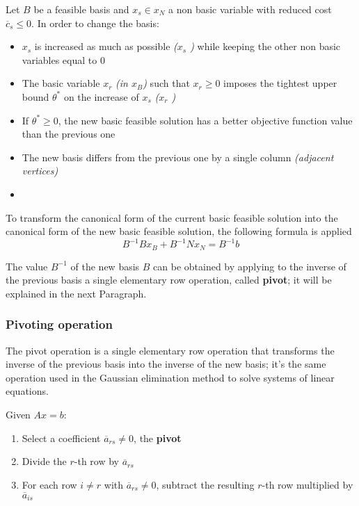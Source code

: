 \documentclass[english]{article}
\begin{document}
\bigskip
Let \(B\) be a feasible basis and \(x_s \in x_N\) a non basic variable with reduced cost \(\overline{c}_s \leq 0\).
In order to change the basis:

\begin{itemize}
  \item \(x_s\) is increased as much as possible \textit{(\(x_s\) )} while keeping the other non basic variables equal to \(0\)
  \item The basic variable \(x_r\) \textit{(in \(x_B\))} such that \(x_r \geq 0\) imposes the tightest upper bound \(\theta^\ast\) on the increase of \(x_s\) \textit{(\(x_r\) )}
  \item If \(\theta^\ast \geq 0\), the new basic feasible solution has a better objective function value than the previous one
  \item The new basis differs from the previous one by a single column \textit{(adjacent vertices)}
  \item
\end{itemize}

To transform the canonical form of the current basic feasible solution into the canonical form of the new basic feasible solution, the following formula is applied
\[B^{-1} B x_B + B^{-1} N x_N = B^{-1} b\]

The value \(B^{-1}\) of the new basis \(B\) can be obtained by applying to the inverse of the previous basis a single elementary row operation, called \textbf{pivot};
it will be explained in the next Paragraph.

\subsubsection{Pivoting operation}
The pivot operation is a single elementary row operation that transforms the inverse of the previous basis into the inverse of the new basis; it's the same operation used in the Gaussian elimination method to solve systems of linear equations.

\bigskip
Given \(Ax = b\):

\begin{enumerate}
  \item Select a coefficient \(\overline{a}_{rs} \neq 0\), the \textbf{pivot}
  \item Divide the \(r\)-th row by \(\overline{a}_{rs}\)
  \item For each row \(i \neq r\) with \(\overline{a}_{rs} \neq 0\), subtract the resulting \(r\)-th row multiplied by \(\overline{a}_{is}\)
\end{enumerate}
\end{document}
